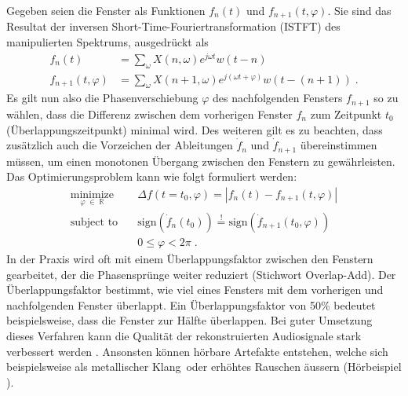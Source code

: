 Gegeben seien die Fenster als Funktionen $f_n(t)$ und $f_{n+1}(t, \varphi)$.
Sie sind das Resultat der inversen Short-Time-Fouriertransformation (ISTFT) des manipulierten Spektrums,
ausgedrückt als
\begin{equation}
    \begin{aligned}
        f_n(t)
        &=
        \sum_{\omega} X(n, \omega) e^{j\omega t} w(t - n) \\
        f_{n+1}(t, \varphi)
        &=
        \sum_{\omega} X(n+1, \omega) e^{j(\omega t + \varphi)} w(t - (n+1)) \;.
    \end{aligned}
\end{equation}
Es gilt nun also die Phasenverschiebung $\varphi$ des nachfolgenden Fensters $f_{n+1}$ so zu wählen,
dass die Differenz zwischen dem vorherigen Fenster $f_n$ zum Zeitpunkt $t_0$ (Überlappungszeitpunkt) minimal wird.
Des weiteren gilt es zu beachten, dass zusätzlich auch die Vorzeichen der Ableitungen $\dot{f}_n$ und $\dot{f}_{n+1}$ übereinstimmen müssen,
um einen monotonen Übergang zwischen den Fenstern zu gewährleisten.
Das Optimierungsproblem kann wie folgt formuliert werden:
\begin{equation}
    \begin{aligned}
        \underset{\varphi \; \in \; \mathbb{R}}{\text{minimize}}
        & \quad
        \Delta f(t=t_0, \varphi) = |f_n(t) - f_{n + 1}(t, \varphi)| \\
        \text{subject to}
        & \quad
        \text{sign}(\dot{f}_n(t_0)) \stackrel{!}{=} \text{sign}(\dot{f}_{n + 1}(t_0, \varphi)) \\
        & \quad
        0 \leq \varphi < 2\pi \;.
    \end{aligned}
\end{equation}
In der Praxis wird oft mit einem Überlappungsfaktor zwischen den Fenstern gearbeitet, der die Phasensprünge weiter reduziert (Stichwort Overlap-Add).
Der Überlappungsfaktor bestimmt, wie viel eines Fensters mit dem vorherigen und nachfolgenden Fenster überlappt.
Ein Überlappungsfaktor von 50\% bedeutet beispielsweise, dass die Fenster zur Hälfte überlappen.
Bei guter Umsetzung dieses Verfahren kann die Qualität der rekonstruierten Audiosignale stark verbessert werden \cite{autotune:phaseVocoderTheroyAndPractice}.
Ansonsten können hörbare Artefakte entstehen, welche sich beispielsweise als \glqq metallischer Klang\grqq\ oder erhöhtes Rauschen äussern (Hörbeispiel \cite{autotune:audioExampleReconstructionArtefacts}).
